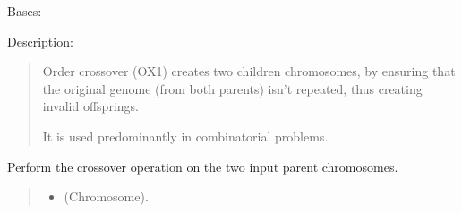 \documentclass[letterpaper,10pt,english]{sphinxmanual}
\begin{document}
\begin{fulllineitems}
\label{\detokenize{pygenalgo.operators.crossover:pygenalgo.operators.crossover.order_crossover.OrderCrossover}}
\pysigstartsignatures
{}
\pysigstopsignatures
\sphinxAtStartPar
Bases: {\hyperref[\detokenize{pygenalgo.operators.crossover:pygenalgo.operators.crossover.crossover_operator.CrossoverOperator}]{}}

\sphinxAtStartPar
Description:
\begin{quote}

\sphinxAtStartPar
Order crossover (OX1) creates two children chromosomes, by ensuring that the original
genome (from both parents) isn’t repeated, thus creating invalid offsprings.

\sphinxAtStartPar
It is used predominantly in combinatorial problems.
\end{quote}

\begin{fulllineitems}
\label{\detokenize{pygenalgo.operators.crossover:pygenalgo.operators.crossover.order_crossover.OrderCrossover.crossover}}
\pysigstartsignatures
{}
\pysigstopsignatures
\sphinxAtStartPar
Perform the crossover operation on the two input parent chromosomes.
\begin{quote}\begin{description}
\begin{itemize}
\item {} 
\sphinxAtStartPar
{} \textendash{} (Chromosome).


\end{itemize}
\end{description}
\end{quote}
\end{fulllineitems}
\end{fulllineitems}
\end{document}

